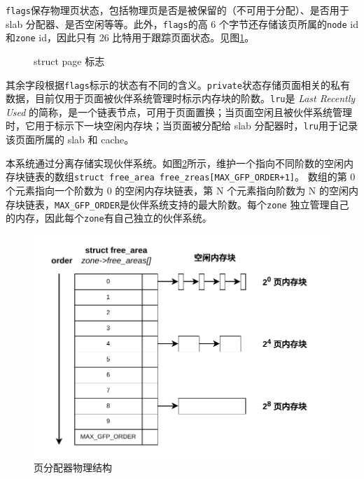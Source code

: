 \documentclass[AutoFakeBold]{LZUThesis}
\begin{document}
\begin{sloppypar}
\texttt{flags}保存物理页状态，包括物理页是否是被保留的（不可用于分配）、是否用于
slab 分配器、是否空闲等等。此外，\texttt{flags}的高 6
个字节还存储该页所属的\texttt{node} id 和\texttt{zone} id，因此只有 26
比特用于跟踪页面状态。见图\ref{fig:struct-page-flags}。

\begin{figure}
\centering

\caption{struct page 标志}
\label{fig:struct-page-flags}
\end{figure}

其余字段根据\texttt{flags}标示的状态有不同的含义。\texttt{private}状态存储页面相关的私有数据，目前仅用于页面被伙伴系统管理时标示内存块的阶数。\texttt{lru}是
\emph{Last Recently Used}
的简称，是一个链表节点，可用于页面置换；当页面空闲且被伙伴系统管理时，它用于标示下一块空闲内存块；当页面被分配给
slab 分配器时，\texttt{lru}用于记录该页面所属的 slab 和 cache。

本系统通过分离存储实现伙伴系统。如图\ref{figure:page-allocator-structure}所示，维护一个指向不同阶数的空闲内存块链表的数组\texttt{struct\ free\_area\ free\_zreas{[}MAX\_GFP\_ORDER+1{]}}。
数组的第 0 个元素指向一个阶数为 0 的空闲内存块链表，第 N
个元素指向阶数为 N
的空闲内存块链表，\texttt{MAX\_GFP\_ORDER}是伙伴系统支持的最大阶数。每个\texttt{zone}
独立管理自己的内存，因此每个\texttt{zone}有自己独立的伙伴系统。

\begin{figure}
\centering
\includegraphics[scale=0.6]{images/free-area.drawio.pdf}
\caption{页分配器物理结构}
\label{figure:page-allocator-structure}
\end{figure}


\end{sloppypar}
\end{document}
